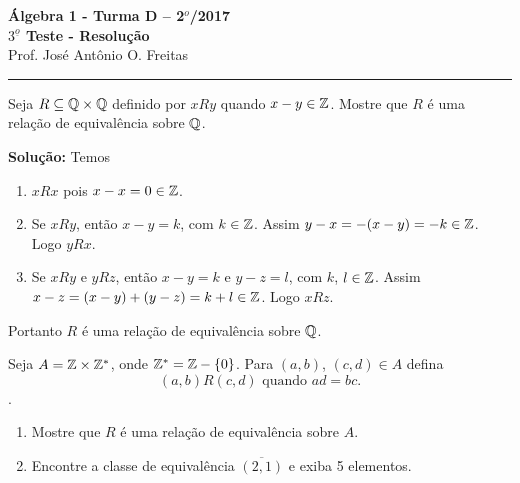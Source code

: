 \documentclass[12pt]{article}
\begin{document}


\begin{center}
{\Large\bf {\'A}lgebra 1 - Turma D -- 2$^{o}$/2017} \\ \vspace{9pt} {\large\bf
  $3^{\underline{o}}$ Teste - Resolu\c{c}\~ao}\\
\vspace{9pt} Prof. Jos{\'e} Ant{\^o}nio O. Freitas
\end{center}
\hrule

\vspace{.6cm}

\questao Seja $R \subseteq \mathbb{Q} \times \mathbb{Q}$ definido por $xRy$ quando $x - y \in \mathbb{Z}$. Mostre que $R$ é uma relação de equivalência sobre $\mathbb{Q}$.

\noindent\textbf{Solu\c{c}\~ao:} Temos
\begin{enumerate}[label={\roman*})]
	\item $xRx$ pois $x - x = 0 \in \mathbb{Z}$.
	\item Se $xRy$, então $x - y = k$, com $k \in \mathbb{Z}$. Assim $y - x = -(x - y) = -k \in \mathbb{Z}$. Logo $yRx$.
	\item Se $xRy$ e $yRz$, então $x - y = k$ e $y - z = l$, com $k$, $l \in \mathbb{Z}$. Assim $x - z = (x - y) + (y - z) = k + l \in \mathbb{Z}$. Logo $xRz$.
\end{enumerate}

Portanto $R$ é uma relação de equivalência sobre $\mathbb{Q}$.


\vspace{.5cm}

\questao Seja $A = \mathbb{Z} \times \mathbb{Z}^*$, onde $\mathbb{Z}^* = \mathbb{Z} - \{0\}$. Para $(a,b)$, $(c,d) \in A$ defina
\[
	(a,b)R(c,d) \mbox{ quando } ad=bc.
\].

\begin{enumerate}[label={\alph*})]
	\item Mostre que $R$ é uma rela{\c c}{\~a}o de equival{\^e}ncia sobre $A$.
	\item Encontre a classe de equivalência $\overline{(2,1)}$ e exiba 5 elementos.
\end{enumerate}
\end{document}
